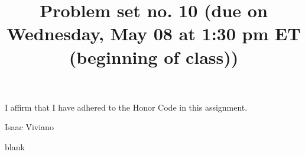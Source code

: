 \documentclass[12pt, reqno]{amsart}
\theoremstyle{definition}
\theoremstyle{remark}
\begin{document}
\title[Math 357 - Harmonic Analysis]{Problem set no. 10 (due on Wednesday, May 08 at 1:30 pm ET (beginning of class))}

\begin{titlepage}
    
\maketitle

I affirm that I have adhered to the Honor Code in this assignment.

Isaac Viviano
\end{titlepage}

blank
\newpage






\end{document}
